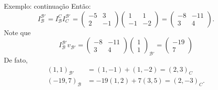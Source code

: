 \documentclass{beamer}
\begin{document}
\begin{darkframes}
\begin{frame}{Exemplo: continuação}
  Então:
  \begin{equation*}
    I_{\mathcal{B}}^{{\mathcal{B}}'} = I_{\mathcal{B}}^C I_C^{{\mathcal{B}}'} = \begin{pmatrix} -5 & 3\\2 & -1\end{pmatrix} \begin{pmatrix} 1 & 1\\-1 & -2\end{pmatrix} = \begin{pmatrix} -8 & -11 \\3 & 4\end{pmatrix}.
  \end{equation*}
  Note que
  \begin{equation*}
    I_{\mathcal{B}}^{{\mathcal{B}}'} v_{{\mathcal{B}}'} = \begin{pmatrix} -8 & -11\\3 & 4\end{pmatrix} \begin{pmatrix} 1\\1\end{pmatrix}_{{\mathcal{B}}'} = \begin{pmatrix} -19\\7\end{pmatrix}
  \end{equation*}
  De fato,
  \begin{align*}
    (1,1)_{{\mathcal{B}}'} &= (1,-1)+(1,-2) = (2,3)_C\\
    (-19,7)_{\mathcal{B}} &= -19(1,2)+7(3,5) = (2,-3)_C.
  \end{align*}
\end{frame}


\end{darkframes}
\end{document}
